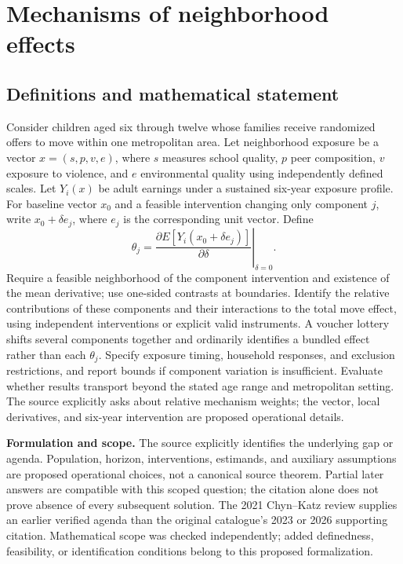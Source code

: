 \documentclass[11pt]{article}
\begin{document}
\section*{Mechanisms of neighborhood effects}\label{30007748}
\subsection{Definitions and mathematical statement}
Consider children aged six through twelve whose families receive randomized offers to move within one metropolitan area. Let neighborhood exposure be a vector \(x=(s,p,v,e)\), where \(s\) measures school quality, \(p\) peer composition, \(v\) exposure to violence, and \(e\) environmental quality using independently defined scales. Let \(Y_i(x)\) be adult earnings under a sustained six-year exposure profile. For baseline vector \(x_0\) and a feasible intervention changing only component \(j\), write \(x_0+\delta e_j\), where \(e_j\) is the corresponding unit vector. Define
\[\theta_j=\left.\frac{\partial E[Y_i(x_0+\delta e_j)]}{\partial\delta}\right|_{\delta=0}.\]
Require a feasible neighborhood of the component intervention and existence of the mean derivative; use one-sided contrasts at boundaries. Identify the relative contributions of these components and their interactions to the total move effect, using independent interventions or explicit valid instruments. A voucher lottery shifts several components together and ordinarily identifies a bundled effect rather than each \(\theta_j\). Specify exposure timing, household responses, and exclusion restrictions, and report bounds if component variation is insufficient. Evaluate whether results transport beyond the stated age range and metropolitan setting. The source explicitly asks about relative mechanism weights; the vector, local derivatives, and six-year intervention are proposed operational details.

\par\textbf{Formulation and scope.} The source explicitly identifies the underlying gap or agenda. Population, horizon, interventions, estimands, and auxiliary assumptions are proposed operational choices, not a canonical source theorem. Partial later answers are compatible with this scoped question; the citation alone does not prove absence of every subsequent solution. The 2021 Chyn–Katz review supplies an earlier verified agenda than the original catalogue’s 2023 or 2026 supporting citation. Mathematical scope was checked independently; added definedness, feasibility, or identification conditions belong to this proposed formalization.
\end{document}
